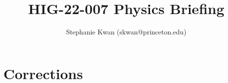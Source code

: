 \documentclass{article}
\title{HIG-22-007 Physics Briefing}
\author{Stephanie Kwan (skwan@princeton.edu)}
\begin{document}
\maketitle


\section{Corrections}
\end{document}
